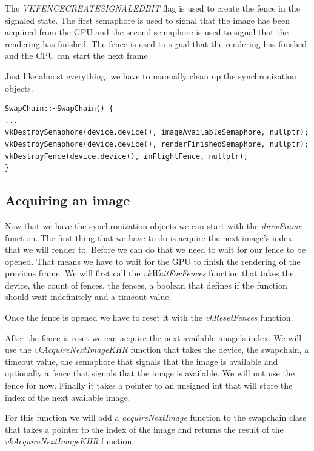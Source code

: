 \documentclass[12pt]{report} \usepackage{preamble}
\begin{document}
The \textit{VK\textunderscore FENCE\textunderscore CREATE\textunderscore SIGNALED\textunderscore BIT} flag is used to create the fence
in the signaled state. The first semaphore is used to signal that the image has been acquired from the \ac{GPU} and the second semaphore
is used to signal that the rendering has finished. The fence is used to signal that the rendering has finished and the CPU can
start the next frame.

Just like almost everything, we have to manually clean up the synchronization objects.

\begin{lstlisting}[Language=C++]
SwapChain::~SwapChain() {
...
vkDestroySemaphore(device.device(), imageAvailableSemaphore, nullptr);
vkDestroySemaphore(device.device(), renderFinishedSemaphore, nullptr);
vkDestroyFence(device.device(), inFlightFence, nullptr);
}
\end{lstlisting}

\subsection{Acquiring an image}

Now that we have the synchronization objects we can start with the \textit{drawFrame} function. The first thing that we have to do
is acquire the next image's index that we will render to. Before we can do that we need to wait for our fence to be opened.
That means we have to wait for the GPU to finish the rendering of the previous frame.
We will first call the \textit{vkWaitForFences} function that takes the device, the count of fences,
the fences, a boolean that defines if the function should wait indefinitely and a timeout value.

Once the fence is opened we have to reset it with the \textit{vkResetFences} function.

After the fence is reset we can acquire the next available image's index. We will use the \textit{vkAcquireNextImageKHR} function that
takes the device, the swapchain, a timeout value, the semaphore that signals that the image is available and optionally a fence that
signals that the image is available. We will not use the fence for now. Finally it takes a pointer to an unsigned int that will store
the index of the next available image.

For this function we will add a \textit{acquireNextImage} function to the swapchain class that takes a pointer to the index of the image
and returns the result of the \textit{vkAcquireNextImageKHR} function.
\end{document}
